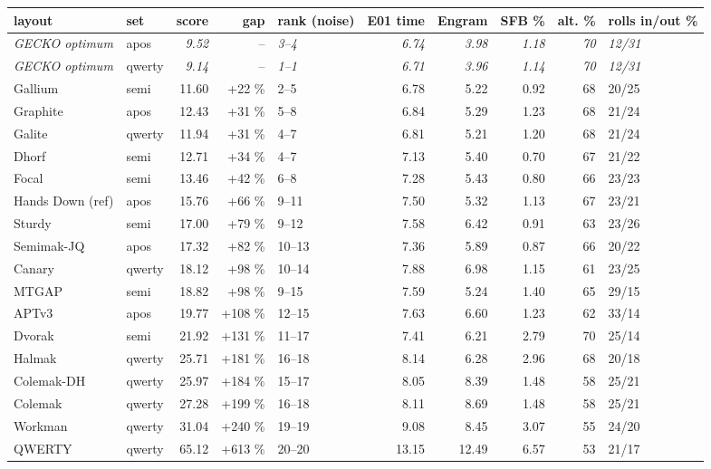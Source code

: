 \documentclass{gecko-paper}
\newcounter{none}
\begin{document}
{{\def\LTcaptype{none} %
\begin{longtable}[]{@{}llrrlrrrrl@{}}
\toprule\noalign{}
layout & set & score & gap & rank (noise) & E01 time & Engram & SFB \% & alt. \% & rolls in/out \% \\
\midrule\noalign{}
\endhead
\bottomrule\noalign{}
\endlastfoot
\emph{GECKO optimum} & apos & \emph{9.52} & – & \emph{3–4} & \emph{6.74} & \emph{3.98} & \emph{1.18} & \emph{70} & \emph{12/31} \\
\emph{GECKO optimum} & qwerty & \emph{9.14} & – & \emph{1–1} & \emph{6.71} & \emph{3.96} & \emph{1.14} & \emph{70} & \emph{12/31} \\
Gallium & semi & 11.60 & +22 \% & 2–5 & 6.78 & 5.22 & 0.92 & 68 & 20/25 \\
Graphite & apos & 12.43 & +31 \% & 5–8 & 6.84 & 5.29 & 1.23 & 68 & 21/24 \\
Galite & qwerty & 11.94 & +31 \% & 4–7 & 6.81 & 5.21 & 1.20 & 68 & 21/24 \\
Dhorf & semi & 12.71 & +34 \% & 4–7 & 7.13 & 5.40 & 0.70 & 67 & 21/22 \\
Focal & semi & 13.46 & +42 \% & 6–8 & 7.28 & 5.43 & 0.80 & 66 & 23/23 \\
Hands Down (ref) & apos & 15.76 & +66 \% & 9–11 & 7.50 & 5.32 & 1.13 & 67 & 23/21 \\
Sturdy & semi & 17.00 & +79 \% & 9–12 & 7.58 & 6.42 & 0.91 & 63 & 23/26 \\
Semimak-JQ & apos & 17.32 & +82 \% & 10–13 & 7.36 & 5.89 & 0.87 & 66 & 20/22 \\
Canary & qwerty & 18.12 & +98 \% & 10–14 & 7.88 & 6.98 & 1.15 & 61 & 23/25 \\
MTGAP & semi & 18.82 & +98 \% & 9–15 & 7.59 & 5.24 & 1.40 & 65 & 29/15 \\
APTv3 & apos & 19.77 & +108 \% & 12–15 & 7.63 & 6.60 & 1.23 & 62 & 33/14 \\
Dvorak & semi & 21.92 & +131 \% & 11–17 & 7.41 & 6.21 & 2.79 & 70 & 25/14 \\
Halmak & qwerty & 25.71 & +181 \% & 16–18 & 8.14 & 6.28 & 2.96 & 68 & 20/18 \\
Colemak-DH & qwerty & 25.97 & +184 \% & 15–17 & 8.05 & 8.39 & 1.48 & 58 & 25/21 \\
Colemak & qwerty & 27.28 & +199 \% & 16–18 & 8.11 & 8.69 & 1.48 & 58 & 25/21 \\
Workman & qwerty & 31.04 & +240 \% & 19–19 & 9.08 & 8.45 & 3.07 & 55 & 24/20 \\
QWERTY & qwerty & 65.12 & +613 \% & 20–20 & 13.15 & 12.49 & 6.57 & 53 & 21/17 \\
\end{longtable}
}

}
\end{document}
